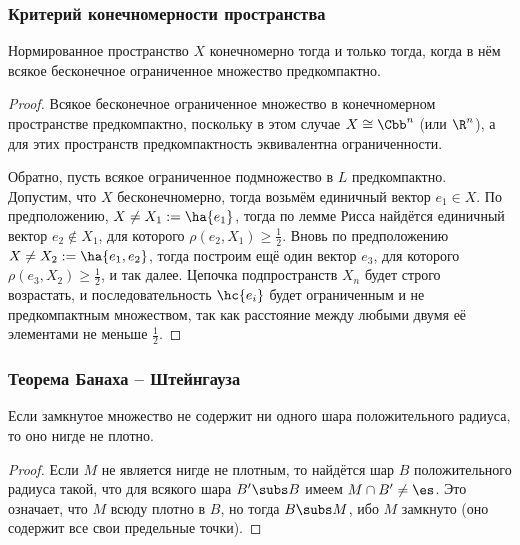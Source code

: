 \documentclass[a4paper]{article}
\begin{document}
\subsubsection{Критерий конечномерности пространства}

\begin{lemma}\label{lem:bounded.eq.compact.dim.finite}
Нормированное пространство $X$ конечномерно тогда и только тогда,
когда в нём всякое бесконечное ограниченное множество предкомпактно.
\end{lemma}
\begin{proof}
Всякое бесконечное ограниченное множество в конечномерном пространстве
предкомпактно, поскольку в этом случае $X \cong \Cbb^n$ (или $\R^n$),
а для этих пространств предкомпактность эквивалентна ограниченности.

Обратно, пусть всякое ограниченное подмножество в $L$ предкомпактно.
Допустим, что $X$ бесконечномерно, тогда возьмём единичный вектор $e_1 \in X$.
По предположению, $X \neq X_1 := \ha{e_1}$, тогда по лемме Рисса найдётся единичный
вектор $e_2 \notin X_1$, для которого $\rho(e_2, X_1) \ge \frac12$.
Вновь по предположению $X \neq X_2 := \ha{e_1,e_2}$, тогда построим
ещё один вектор $e_3$, для которого $\rho(e_3, X_2) \ge \frac12$, и так далее.
Цепочка подпространств $X_n$ будет строго возрастать, и последовательность $\hc{e_i}$
будет ограниченным и не предкомпактным множеством, так как расстояние между любыми двумя
её элементами не меньше $\frac12$.
\end{proof}


\subsubsection{Теорема Банаха -- Штейнгауза}

\begin{lemma}
Если замкнутое множество не содержит ни одного шара положительного радиуса, то оно нигде не плотно.
\end{lemma}
\begin{proof}
Если $M$ не является нигде не плотным, то найдётся шар $B$ положительного радиуса
такой, что для всякого шара $B' \subs B$ имеем $M \cap B' \neq \es$. Это означает,
что $M$ всюду плотно в $B$, но тогда $B \subs M$,
ибо $M$ замкнуто (оно содержит все свои предельные точки).
\end{proof}
\end{document}
